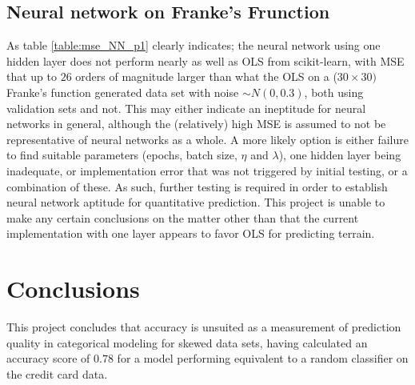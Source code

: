\documentclass[%
oneside,                 %
final,                   %
10pt]{article}
\begin{document}
\subsection{Neural network on Franke's Frunction}
As table \ref{table:mse_NN_p1} clearly indicates; the neural network using one hidden layer does not perform nearly as well as OLS from scikit-learn, with MSE that up to $26$ orders of magnitude larger than what the OLS  on a ($30 \times 30)$ Franke's function generated data set with noise $\sim N(0,0.3)$, both using validation sets and not. This may either indicate an ineptitude for neural networks in general, although the (relatively) high MSE is assumed to not be representative of neural networks as a whole. A more likely option is either failure to find suitable parameters (epochs, batch size, $\eta$ and $\lambda$), one hidden layer being inadequate, or implementation error that was not triggered by initial testing, or a combination of these. As such, further testing is required in order to establish neural network aptitude for quantitative prediction. This project is unable to make any certain conclusions on the matter other than that the current implementation with one layer appears to favor OLS for predicting terrain.

\section{Conclusions} \label{Section_Conclusions}
This project concludes that accuracy is unsuited as a measurement of prediction quality in categorical modeling for skewed data sets, having calculated an accuracy score of $0.78$ for a model performing equivalent to a random classifier on the credit card data.



\end{document}
